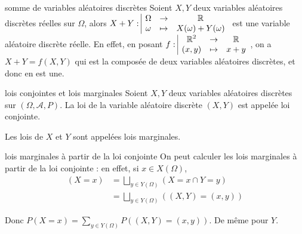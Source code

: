 \begin{corollaire}{somme de variables aléatoires discrètes}{}
    Soient $X, Y$ deux variables aléatoires discrètes réelles sur $\Omega$, alors 
    $X + Y: \space \begin{array}{|ccc} \displaystyle \Omega & \to & \displaystyle \mathbb{R} \\ \displaystyle \omega & \mapsto & \displaystyle X(\omega) + Y(\omega) \end{array}$ est une variable aléatoire discrète 
    réelle. En effet, en posant $f: \space \begin{array}{|ccc} \displaystyle \mathbb{R}^2 & \to & \displaystyle \mathbb{R} \\ \displaystyle (x, y) & \mapsto & \displaystyle x + y \end{array}$, on a $X + Y = f(X, Y)$ qui est 
    la composée de deux variables aléatoires discrètes, et donc en est une. 
\end{corollaire}

\begin{definition}{lois conjointes et lois marginales}{}
    Soient $X, Y$ deux variables aléatoires discrètes sur $(\Omega, \mathcal A, P)$.
    La loi de la variable aléatoire discrète $(X, Y)$ est appelée loi conjointe. 

    Les lois de $X$ et $Y$ sont appelées lois marginales.
\end{definition}

\begin{proposition}{lois marginales à partir de la loi conjointe}{}
    On peut calculer les lois marginales à partir de la loi conjointe : en effet, si 
    $x \in X(\Omega)$, 
    \begin{align}
        (X = x) & = \bigsqcup_{y \in Y(\Omega)} (X = x \cap Y = y) \\
        & = \bigsqcup_{y \in Y(\Omega)} ((X, Y) = (x, y))
    \end{align}

    Donc $\displaystyle P(X = x) = \sum_{y \in Y(\Omega)} P((X, Y) = (x, y))$.
    De même pour $Y$. 
\end{proposition}

